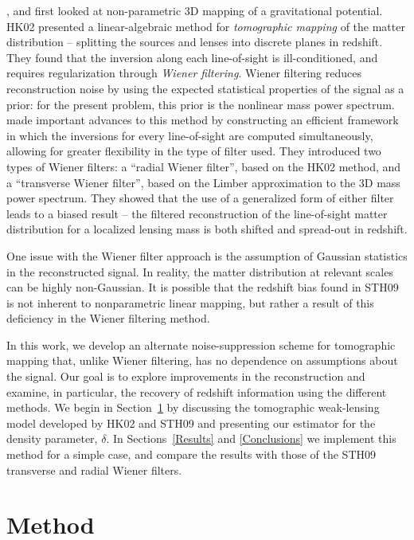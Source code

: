 \citet{Taylor01}, \citet[][hereafter HK02]{Hu02} and 
\citet{Bacon03} first looked at
non-parametric 3D mapping of a gravitational potential.  HK02
presented a linear-algebraic method for \textit{tomographic mapping}
of the matter distribution -- splitting the sources and lenses into
discrete planes in redshift.  They found that the inversion along each
line-of-sight is ill-conditioned, and requires regularization through 
\textit{Wiener filtering}.  Wiener filtering reduces reconstruction noise
by using the expected statistical properties of the signal as a prior: 
for the present problem, this prior is the nonlinear mass power spectrum.  
\citet[][hereafter STH09]{Simon09}
made important advances to this method by constructing an efficient
framework in which the inversions for every line-of-sight are computed
simultaneously, allowing for greater flexibility in the
type of filter used.  They introduced two types of Wiener filters: 
a ``radial Wiener filter'', based on the HK02 method, 
and a ``transverse Wiener filter'', 
based on the Limber approximation to
the 3D mass power spectrum.
They showed that the use of a generalized form of either
filter leads to a biased result -- the filtered reconstruction of the
line-of-sight matter distribution for a localized lensing mass is both
shifted and spread-out in redshift.

One issue with the Wiener filter approach is the assumption of
Gaussian statistics in the reconstructed signal.  In reality, the matter 
distribution at relevant scales can be highly non-Gaussian.  
It is possible that the redshift bias found in STH09 is not inherent
to nonparametric linear mapping, but rather a result of this deficiency
in the Wiener filtering method.

In this work, we develop an alternate noise-suppression scheme for
tomographic mapping that,  unlike Wiener filtering, has no dependence
on assumptions about the signal.   Our goal is to explore improvements
in the reconstruction and examine, in particular, the recovery of
redshift information using the different methods. We begin in 
Section~\ref{Method} 
by discussing the tomographic weak-lensing model developed by HK02
and STH09 and presenting our estimator for the density parameter, $\delta$.  
In Sections~\ref{Results} and \ref{Conclusions} we implement this method
for a simple case, and compare the results with those of the STH09 transverse
and radial Wiener filters.

\section{Method}
\label{Method}

